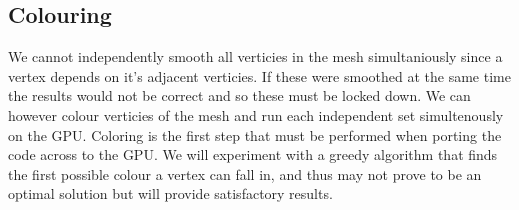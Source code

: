 \subsection*{Colouring}
We cannot independently smooth all verticies in the mesh simultaniously since a vertex depends on it's adjacent verticies. If these were smoothed at the same time the results would not be correct and so these must be locked down. We can however colour verticies of the mesh and run each independent set simultenously on the GPU.
Coloring is the first step that must be performed when porting the code across to the GPU.
We will experiment with a greedy algorithm that finds the first possible colour a vertex can fall in, and thus may not prove to be an optimal solution but will provide satisfactory results.


